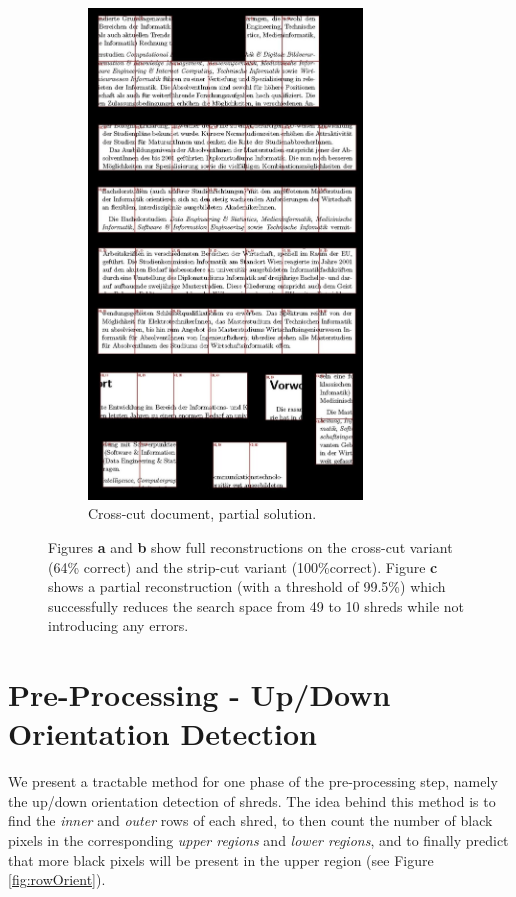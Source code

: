 \documentclass{llncs}
\begin{document}
\begin{figure}[h!]
\begin{subfigure}[b]{0.48\textwidth}
        \includegraphics[width=0.8\textwidth]{stopped7x7_300.jpg}
        \caption{Cross-cut document, partial solution.}
    \end{subfigure}
     \caption{Figures {\bf a} and {\bf b} show full reconstructions on the cross-cut variant (64\% correct) and the strip-cut variant (100\%correct). Figure {\bf c} shows a partial reconstruction (with a threshold of 99.5\%) which successfully reduces the search space from 49 to 10 shreds while not introducing any errors.}
    \label{fig:searchRez}
\end{figure}

\section{Pre-Processing - Up/Down Orientation Detection}
We present a tractable method for one phase of the pre-processing step, namely the up/down orientation detection of shreds. 
The idea behind this method is to find the \emph{inner} and \emph{outer} rows of each shred, to then count the number of black pixels in the corresponding \emph{upper regions} and \emph{lower regions}, and to finally predict that more black pixels will be present in the upper region (see Figure \ref{fig:rowOrient}). 
\end{document}
